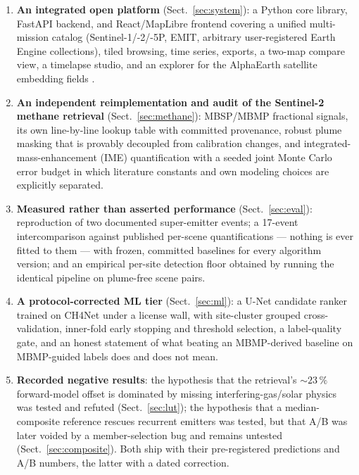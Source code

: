 \documentclass[11pt]{article}
\begin{document}
\begin{enumerate}\itemsep2pt
  \item \textbf{An integrated open platform} (Sect.~\ref{sec:system}): a
  Python core library, FastAPI backend, and React/MapLibre frontend
  covering a unified multi-mission catalog (Sentinel-1/-2/-5P, EMIT,
  arbitrary user-registered Earth Engine collections), tiled browsing,
  time series, exports, a two-map compare view, a timelapse studio, and an
  explorer for the AlphaEarth satellite embedding fields
  \citep{brown2025alphaearth}.
  \item \textbf{An independent reimplementation and audit of the
  Sentinel-2 methane retrieval} (Sect.~\ref{sec:methane}): MBSP/MBMP
  fractional signals, its own line-by-line lookup table with committed
  provenance, robust plume masking that is provably decoupled from
  calibration changes, and integrated-mass-enhancement (IME)
  quantification with a seeded joint Monte Carlo error budget in which
  literature constants and own modeling choices are explicitly separated.
  \item \textbf{Measured rather than asserted performance}
  (Sect.~\ref{sec:eval}): reproduction of two documented super-emitter
  events; a 17-event intercomparison against published per-scene
  quantifications --- nothing is ever fitted to them --- with frozen,
  committed baselines for every algorithm version; and an empirical
  per-site detection floor obtained by running the identical pipeline on
  plume-free scene pairs.
  \item \textbf{A protocol-corrected ML tier} (Sect.~\ref{sec:ml}): a
  U-Net candidate ranker trained on CH4Net \citep{vaughan2024} under a
  license wall, with site-cluster grouped cross-validation, inner-fold
  early stopping and threshold selection, a label-quality gate, and an
  honest statement of what beating an MBMP-derived baseline on
  MBMP-guided labels does and does not mean.
  \item \textbf{Recorded negative results}: the hypothesis that the
  retrieval's ${\sim}23\,\%$ forward-model offset is dominated by missing
  interfering-gas/solar physics was tested and refuted
  (Sect.~\ref{sec:lut}); the hypothesis that a median-composite reference
  rescues recurrent emitters was tested, but that A/B was later voided by a
  member-selection bug and remains untested (Sect.~\ref{sec:composite}).
  Both ship with their pre-registered predictions and A/B numbers, the
  latter with a dated correction.
\end{enumerate}
\end{document}
